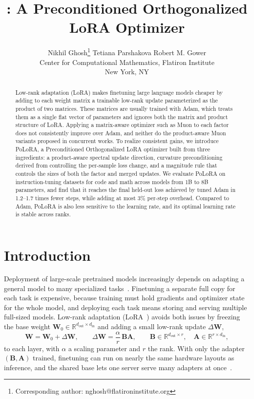 \documentclass[11pt]{article}
\title{\methodname: A Preconditioned Orthogonalized LoRA Optimizer}
\author{
Nikhil Ghosh\footnote{Corresponding author: nghosh@flatironinstitute.org} \hspace{1cm}
Tetiana Parshakova \hspace{1cm}
Robert M. Gower\\[0.5em]
Center for Computational Mathematics, Flatiron Institute\\
New York, NY
}
\date{}
\newcommand{\mat}[1]{\bm{#1}}
\newcommand{\R}{\mathbb{R}}
\newcommand{\DW}{\Delta\mat{W}}
\begin{document}
\maketitle

\begin{abstract}
Low-rank adaptation (LoRA) makes finetuning large language models cheaper by adding to each weight matrix a trainable low-rank update parameterized as the product of two matrices. These matrices are usually trained with Adam, which treats them as a single flat vector of parameters and ignores both the matrix and product structure of LoRA. Applying a matrix-aware optimizer such as Muon to each factor does not consistently improve over Adam, and neither do the product-aware Muon variants proposed in concurrent works. To realize consistent gains, we introduce PoLoRA, a Preconditioned Orthogonalized LoRA optimizer built from three ingredients: a product-aware spectral update direction, curvature preconditioning derived from controlling the per-sample loss change, and a magnitude rule that controls the sizes of both the factor and merged updates. We evaluate PoLoRA on instruction-tuning datasets for code and math across models from 1B to 8B parameters, and find that it reaches the final held-out loss achieved by tuned Adam in 1.2--1.7 times fewer steps, while adding at most 3\% per-step overhead. Compared to Adam, PoLoRA is also less sensitive to the learning rate, and its optimal learning rate is stable across ranks.
\end{abstract}

\section{Introduction}
\label{sec:intro}

Deployment of large-scale pretrained models increasingly depends on adapting a
general model to many specialized tasks~\cite{foundation_models}. Finetuning a separate full copy for each task is expensive, because training must hold gradients and optimizer state for the whole model, and deploying each task means storing and serving multiple full-sized models. Low-rank adaptation (LoRA~\cite{lora}) avoids both issues by freezing the base weight $\mat{W}_0 \in \R^{d_{\mathrm{out}} \times d_{\mathrm{in}}}$ and adding a small low-rank update $\Delta\mat{W}$,
\begin{equation}
\mat{W} = \mat{W}_0 + \DW, \qquad \DW = \frac{\alpha}{r}\,\mat{B}\mat{A}, \qquad
\mat{B} \in \mathbb{R}^{d_{\mathrm{out}} \times r}, \quad
\mat{A} \in \mathbb{R}^{r \times d_{\mathrm{in}}},
\label{eq:lora}
\end{equation}
to each layer, with $\alpha$ a scaling parameter and $r$ the rank. With only the adapter $(\mat{B}, \mat{A})$ trained, finetuning can run on nearly the same hardware layouts as inference, and the shared base lets one server serve many adapters at once~\cite{punica,bitdelta,schulman2025lora}.
\end{document}
